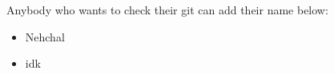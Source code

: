 \documentclass[11pt]{article}
\begin{document}
Anybody who wants to check their git can add their name below:
\begin{itemize}
    \item Nehchal
    \item idk
\end{itemize}
\end{document}
